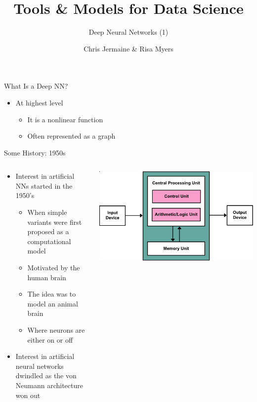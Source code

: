 \documentclass[aspectratio=169]{beamer}
\title[]
{Tools \& Models for Data Science}
\subtitle{Deep Neural Networks (1)}
\author[]{Chris Jermaine \& Risa Myers}
\institute
{
  Rice University 
}
\date[]{}
\begin{document}
\begin{frame}
 \titlepage
\end{frame}
\begin{frame}{What Is a Deep NN?}

\begin{itemize}
	\item At highest level
	\begin{itemize}
		\item It is a nonlinear function
		\item Often represented as a graph
	\end{itemize}
\end{itemize}
\end{frame}
\begin{frame}{Some History: 1950s}

\begin{columns}
\begin{column}{0.6\textwidth}
\begin{itemize}
	\item Interest in artificial NNs started in the 1950's
	\begin{itemize}
		\item When simple variants were first proposed as a computational model
		\item Motivated by the human brain
		\item The idea was to model an animal brain
		\item Where neurons are either on or off
	\end{itemize}
	\item Interest in artificial neural networks dwindled as the von Neumann architecture won out
\end{itemize}
\end{column}
\begin{column}{0.4\textwidth}
\includegraphics[width=1\textwidth]{lectFF/vna.pdf}
\end{column}
\end{columns}
\end{frame}
\end{document}
